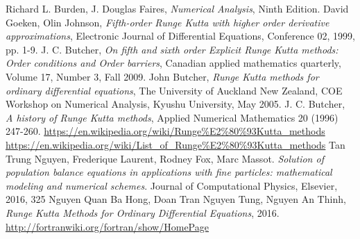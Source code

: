 \documentclass[a4paper,oneside]{book}
\numberwithin{equation}{chapter}
\begin{document}
\begin{thebibliography}{999}
 Richard L. Burden, J. Douglas Faires, \textit{Numerical Analysis}, Ninth Edition.
 David Goeken, Olin Johnson, \textit{Fifth-order Runge Kutta with higher order derivative approximations}, Electronic Journal of Differential Equations, Conference 02, 1999, pp. 1-9.
 J. C. Butcher, \textit{On fifth and sixth order Explicit Runge Kutta methods: Order conditions and Order barriers}, Canadian applied mathematics quarterly, Volume 17, Number 3, Fall 2009.
 John Butcher, \textit{Runge Kutta methods for ordinary differential equations}, The University of Auckland New Zealand, COE Workshop on Numerical Analysis, Kyushu University, May 2005.
 J. C. Butcher, \textit{A history of Runge Kutta methods}, Applied Numerical Mathematics 20 (1996) 247-260.
 \url{https://en.wikipedia.org/wiki/Runge%E2%80%93Kutta_methods}
 \url{https://en.wikipedia.org/wiki/List_of_Runge%E2%80%93Kutta_methods}
 Tan Trung Nguyen, Frederique Laurent, Rodney Fox, Marc Massot. \textit{Solution of population balance equations in applications with fine particles: mathematical modeling and numerical schemes}. Journal of Computational Physics, Elsevier, 2016, 325
	 Nguyen Quan Ba Hong, Doan Tran Nguyen Tung, Nguyen An Thinh, \textit{Runge Kutta Methods for Ordinary Differential Equations}, 2016.
	 \url{http://fortranwiki.org/fortran/show/HomePage}
\end{thebibliography}
\end{document}
